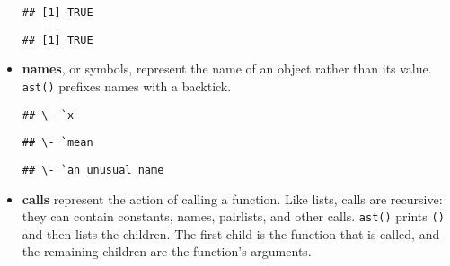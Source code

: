 \begin{itemize}
\begin{verbatim}
## [1] TRUE
\end{verbatim}

\begin{Shaded}
\begin{Highlighting}[]
\NormalTok{(}\NormalTok{, }\NormalTok{(}\NormalTok{))}
\end{Highlighting}
\end{Shaded}

\begin{verbatim}
## [1] TRUE
\end{verbatim}
\item
  \textbf{names}, or symbols, represent the name of an object rather
  than its value. \texttt{ast()} prefixes names with a backtick.
   

\begin{Shaded}
\begin{Highlighting}[]
\end{Highlighting}
\end{Shaded}

\begin{verbatim}
## \- `x
\end{verbatim}

\begin{Shaded}
\begin{Highlighting}[]
\end{Highlighting}
\end{Shaded}

\begin{verbatim}
## \- `mean
\end{verbatim}

\begin{Shaded}
\begin{Highlighting}[]
\NormalTok{(}\NormalTok{)}
\end{Highlighting}
\end{Shaded}

\begin{verbatim}
## \- `an unusual name
\end{verbatim}
\item
  \textbf{calls} represent the action of calling a function. Like lists,
  calls are recursive: they can contain constants, names, pairlists, and
  other calls. \texttt{ast()} prints \texttt{()} and then lists the
  children. The first child is the function that is called, and the
  remaining children are the function's arguments. 


\end{itemize}
